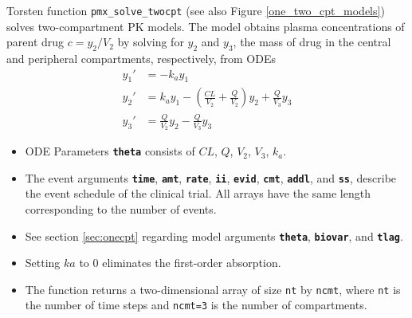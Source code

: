 \documentclass[11pt, reqno, oneside]{amsbook}
\numberwithin{equation}{chapter}
\numberwithin{figure}{chapter}
\numberwithin{table}{chapter}
\theoremstyle{remark}
\begin{document}
Torsten function \texttt{pmx\_solve\_twocpt} (see also Figure \ref{one_two_cpt_models}) solves two-compartment PK
models. The model obtains plasma concentrations of parent drug \(c=y_2/V_2\)
by solving for \(y_2\) and \(y_3\), the mass of drug in the central and peripheral compartments,
respectively, from ODEs
\begin{subequations}
  \begin{align} \label{eq:twocpt}
    y_1' &= -k_a y_1 \\
    y_2' &= k_a y_1 - \left(\frac{CL}{V_2} + \frac{Q}{V_2}\right) y_2 +  \frac{Q}{V_3}  y_3  \\ 
    y_3' &= \frac{Q}{V_2} y_2 - \frac{Q}{V_3} y_3
  \end{align}
\end{subequations}

\begin{itemize}
\item ODE Parameters {\small \color{MRGGreen} \texttt{\textbf{theta}}} consists of \(CL\), \(Q\), \(V_2\), \(V_3\), \(k_a\).
\item The event arguments {\small \color{MRGGreen} \texttt{\textbf{time}}}, {\small \color{MRGGreen} \texttt{\textbf{amt}}}, {\small \color{MRGGreen} \texttt{\textbf{rate}}}, {\small \color{MRGGreen} \texttt{\textbf{ii}}}, {\small \color{MRGGreen} \texttt{\textbf{evid}}}, {\small \color{MRGGreen} \texttt{\textbf{cmt}}}, {\small \color{MRGGreen} \texttt{\textbf{addl}}}, and
{\small \color{MRGGreen} \texttt{\textbf{ss}}}, describe the event schedule of the clinical
trial. All arrays have the same length corresponding to the number of events.
\item See section \ref{sec:onecpt} regarding model arguments {\small \color{MRGGreen} \texttt{\textbf{theta}}}, {\small \color{MRGGreen} \texttt{\textbf{biovar}}}, and {\small \color{MRGGreen} \texttt{\textbf{tlag}}}.
\item Setting \(ka\) to 0 eliminates the first-order absorption.
\item The function returns a two-dimensional array of size \texttt{nt}
by \texttt{ncmt}, where \texttt{nt} is the number of time steps and
\texttt{ncmt=3} is the number of compartments.
\end{itemize}
\end{document}
